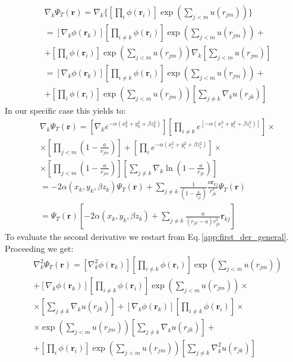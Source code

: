 \begin{align}
    &\nabla_k\Psi_T(\mathbf{r}) = \nabla_k \bigg\{ \left[ \prod_i \phi(\mathbf{r}_i) \right] \exp{\left(\sum_{j<m}u(r_{jm})\right)} \bigg\} \nonumber\\
    &= \left[ \nabla_k \phi(\mathbf{r}_k) \right] \left[ \prod_{i \neq k} \phi(\mathbf{r}_i) \right] \exp{\left(\sum_{j<m}u(r_{jm})\right)} + \nonumber \\ 
    & + \left[\prod_i \phi(\mathbf{r}_i)  \right] \exp{\left(\sum_{j<m} u(r_{jm}) \right)} \nabla_k \left[ \sum_{j<m} u(r_{jm}) \right] \nonumber \\
    &= \left[ \nabla_k \phi(\mathbf{r}_k) \right] \left[ \prod_{i \neq k} \phi(\mathbf{r}_i) \right] \exp{\left(\sum_{j<m}u(r_{jm})\right)} + \nonumber\\
    & + \left[\prod_i \phi(\mathbf{r}_i) \right] \exp{\left(\sum_{j<m} u(r_{jm}) \right)} \left[ \sum_{j\neq k} \nabla_k u(r_{jk}) \right]
    \label{app:first_der_general}
\end{align}
In our specific case this yields to: 
\begin{align}
    &\nabla_k\Psi_T(\mathbf{r}) =\left[ \nabla_k  e^{  -\alpha(x_k^2 + y_k^2 + \beta z_k^2)} \right] \left[ \prod_{i \neq k}  e^{\left[ -\alpha(x_i^2 + y_i^2 + \beta z_i^2) \right]} \right] \times \nonumber \\
    & \times\left[ \prod_{j<m} \left( 1 - \frac{a}{r_{jm}} \right) \right] +  \left[\prod_i e^{ -\alpha (x_i^2 + y_i^2 + \beta z_i^2)} \right] \times \nonumber \\
    &\times \left[\prod_{j<m} \left( 1 - \frac{a}{r_{jm}} \right) \right] \left[ \sum_{j\neq k} \nabla_k \ln \left( 1 - \frac{a}{r_{jk}} \right) \right] \nonumber \\
    &= -2\alpha (x_k, y_k, \beta z_k) \Psi_T(\mathbf{r}) +  \sum_{j\neq k} \frac{1}{\left( 1 - \frac{a}{r_{jk}} \right)} \frac{a \mathbf{r}_{kj}}{r_{jk}^{3}} \Psi_T(\mathbf{r}) \nonumber \\
    &= \Psi_T(\mathbf{r}) \left[ -2\alpha (x_k, y_k, \beta z_k) + \sum_{j\neq k} \frac{a}{\left( r_{jk} - a \right) r_{jk}^2} \mathbf{r}_{kj} \right] 
    \label{app:first_der_specific}
\end{align}
To evaluate the second derivative we restart from Eq.\,\ref{app:first_der_general}.
Proceeding we get:
\begin{align*}
    &\nabla_k^2 \Psi_T(\mathbf{r}) = \left[ \nabla_k^2 \phi(\mathbf{r}_k) \right] \left[ \prod_{i \neq k} \phi(\mathbf{r}_i) \right] \exp{\left(\sum_{j<m}u(r_{jm})\right)} \\ 
    &+ \left[ \nabla_k \phi(\mathbf{r}_k) \right]  \left[ \prod_{i \neq k} \phi(\mathbf{r}_i) \right] \exp{\left(\sum_{j<m}u(r_{jm})\right)}\times \\
    & \times \left[ \sum_{j\neq k} \nabla_k u(r_{jk}) \right] + \left[ \nabla_k \phi(\mathbf{r}_k) \right] \left[ \prod_{i \neq k} \phi(\mathbf{r}_i) \right] \times \\
    & \times \exp{\left(\sum_{j<m} u(r_{jm}) \right)} \left[ \sum_{j\neq k} \nabla_k u(r_{jk}) \right] + \\ 
    &+\left[\prod_i \phi(\mathbf{r}_i) \right] \exp{\left(\sum_{j<m} u(r_{jm}) \right)} \left[ \sum_{j\neq k} \nabla_k^2 u(r_{jk}) \right] 
\end{align*}
